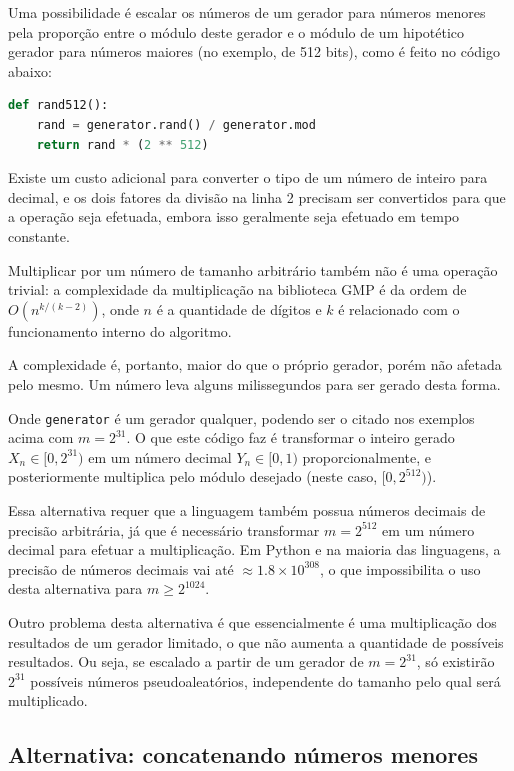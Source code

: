 \documentclass[12pt]{article}
\begin{document}
Uma possibilidade é escalar os números de um gerador para números menores pela
proporção entre o módulo deste gerador e o módulo de um hipotético gerador para
números maiores (no exemplo, de 512 bits), como é feito no código abaixo:

\begin{lstlisting}[language=Python]
def rand512():
    rand = generator.rand() / generator.mod
    return rand * (2 ** 512)
\end{lstlisting}

Existe um custo adicional para converter o tipo de um número de inteiro para
decimal, e os dois fatores da divisão na linha 2 precisam ser convertidos para
que a operação seja efetuada, embora isso geralmente seja efetuado em tempo
constante.

Multiplicar por um número de tamanho arbitrário também não é uma operação
trivial: a complexidade da multiplicação na biblioteca GMP é da ordem de
$O(n^{k/(k - 2)})$, onde $n$ é a quantidade de dígitos e $k$ é relacionado com
o funcionamento interno do algoritmo.

A complexidade é, portanto, maior do que o próprio gerador, porém não afetada
pelo mesmo. Um número leva alguns milissegundos para ser gerado desta forma.

Onde \texttt{generator} é um gerador qualquer, podendo ser o citado nos
exemplos acima com $m = 2^{31}$. O que este código faz é transformar o inteiro
gerado $X_{n} \in [0, 2^{31})$ em um número decimal $Y_{n} \in [0, 1)$
proporcionalmente, e posteriormente multiplica pelo módulo desejado (neste
caso, $[0, 2^{512})$).

Essa alternativa requer que a linguagem também possua números decimais de
precisão arbitrária, já que é necessário transformar $m = 2^{512}$ em um
número decimal para efetuar a multiplicação. Em Python e na maioria das
linguagens, a precisão de números decimais vai até
$\approx 1.8 \times 10^{308}$, o que impossibilita o uso desta alternativa para
$m \geq 2^{1024}$.

Outro problema desta alternativa é que essencialmente é uma multiplicação dos
resultados de um gerador limitado, o que não aumenta a quantidade de possíveis
resultados. Ou seja, se escalado a partir de um gerador de $m = 2^{31}$, só
existirão $2^{31}$ possíveis números pseudoaleatórios, independente do tamanho
pelo qual será multiplicado.

\subsection{Alternativa: concatenando números menores}
\end{document}
